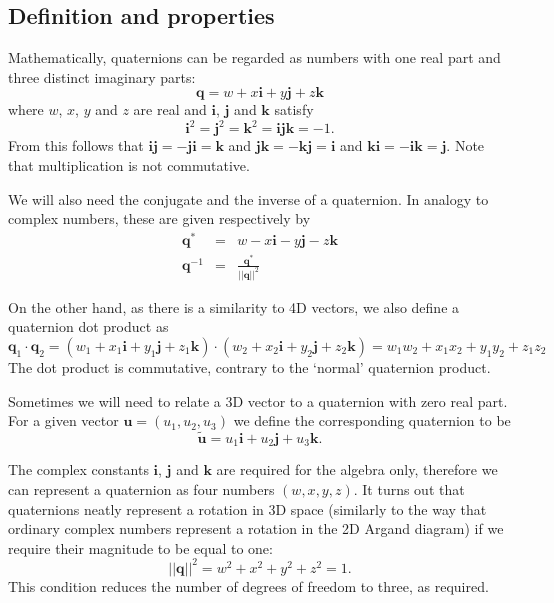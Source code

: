 \subsection{Definition and properties}
Mathematically, quaternions can be regarded as numbers with one real part and three
distinct imaginary parts:
\begin{equation}
\mathbf{q} = w + x\mathbf{i} + y\mathbf{j} + z\mathbf{k}
\end{equation}
where $w$, $x$, $y$ and $z$ are real and $\mathbf{i}$, $\mathbf{j}$ and $\mathbf{k}$ satisfy
\begin{equation}
\mathbf{i}^2 = \mathbf{j}^2 = \mathbf{k}^2 = \mathbf{i}\mathbf{j}\mathbf{k} = -1.
\end{equation}
From this follows that
$\mathbf{i}\mathbf{j} = -\mathbf{j}\mathbf{i} = \mathbf{k}$ and
$\mathbf{j}\mathbf{k} = -\mathbf{k}\mathbf{j} = \mathbf{i}$ and
$\mathbf{k}\mathbf{i} = -\mathbf{i}\mathbf{k} = \mathbf{j}$.
Note that multiplication is not commutative.

We will also need the conjugate and the inverse of a quaternion. In analogy to
complex numbers, these are given respectively by
\begin{eqnarray}
\mathbf{q}^\ast & = & w - x\mathbf{i} - y\mathbf{j} - z\mathbf{k}\\
\mathbf{q}^{-1} & = & \frac{\mathbf{q}^\ast}{||\mathbf{q}||^2}
\end{eqnarray}

On the other hand, as there is a similarity to 4D vectors, we also define a
quaternion dot product as
\begin{equation}
\mathbf{q}_1\cdot\mathbf{q}_2 =
    (w_1 + x_1\mathbf{i} + y_1\mathbf{j} + z_1\mathbf{k})\cdot
    (w_2 + x_2\mathbf{i} + y_2\mathbf{j} + z_2\mathbf{k}) =
    w_1 w_2 + x_1 x_2 + y_1 y_2 + z_1 z_2
\end{equation}
The dot product is commutative, contrary to the `normal' quaternion product.

Sometimes we will need to relate a 3D vector to a quaternion with zero real part.
For a given vector $\mathbf{u} = (u_1, u_2, u_3)$ we define the corresponding
quaternion to be
\begin{equation}
\label{vectorToQuat}
\tilde{\mathbf{u}} = u_1\mathbf{i} + u_2\mathbf{j} + u_3\mathbf{k}.
\end{equation}

The complex constants $\mathbf{i}$, $\mathbf{j}$ and $\mathbf{k}$ are required for the algebra
only, therefore we can represent a quaternion as four numbers $(w,x,y,z)$. It turns out that
quaternions neatly represent a rotation in 3D space (similarly to the way that ordinary complex
numbers represent a rotation in the 2D Argand diagram) if we require their magnitude to be
equal to one:
\begin{equation}
\label{unitQuat}
||\mathbf{q}||^2 = w^2 + x^2 + y^2 + z^2 = 1.
\end{equation}
This condition reduces the number of degrees of freedom to three, as required.

